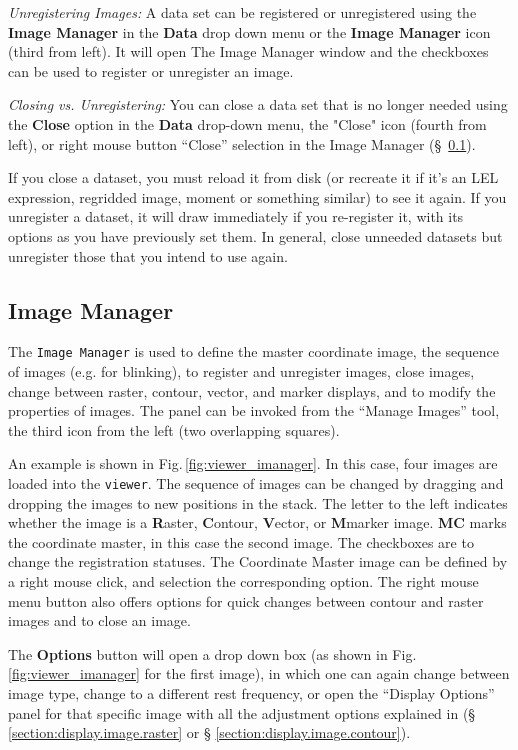 {\em Unregistering Images:} A data set can be registered or
unregistered using the {\bf Image Manager}
in the {\bf  Data} drop down menu or the {\bf Image Manager} icon
(third from left). It will open The Image Manager window and the
checkboxes can be used to register or unregister an image. 

{\em Closing vs. Unregistering:} You can close a data set that is no longer needed using the {\bf Close}
option in the {\bf Data} drop-down menu, the "Close" icon (fourth from
left), or right mouse button ``Close'' selection in the Image Manager (\S~\ref{section:display.viewerGUI.imanager}). 

If you close a dataset, you must reload it from disk (or recreate it if it's an LEL expression, regridded image, 
moment or something similar) to see it again.  If you unregister a dataset, it will draw immediately if you 
re-register it, with its options as you have 
previously set them.  In general, close unneeded datasets but unregister those that you intend to use again.

\subsection{Image Manager}
\label{section:display.viewerGUI.imanager}

The {\tt Image Manager} is used to define the master coordinate image,
the sequence of images (e.g. for blinking), to register and unregister
images, close images, change between raster, contour, vector, and
marker displays, and to modify the properties of images. The panel
can be invoked from the ``Manage Images'' tool, the third icon from
the left (two overlapping squares).

An example is shown in Fig.\,\ref{fig:viewer_imanager}. In this case,
four images are loaded into the {\tt viewer}. The sequence of images
can be changed by dragging and dropping the images to new positions in
the stack. The letter to the left indicates whether the image is a
{\bf R}aster, {\bf C}ontour, {\bf V}ector, or {\bf M}marker
image. {\bf MC} marks the coordinate master, in this case the second
image. The checkboxes are to change the registration statuses. The
Coordinate Master image can be defined by a right mouse click, and
selection the corresponding option. The right mouse menu button also
offers options for quick changes between contour and raster images and
to close an image.

The {\bf Options} button will open a drop down box (as shown in
Fig.\,\ref{fig:viewer_imanager} for the first image), in which one
can again change between image type, change to a different rest
frequency, or open the ``Display Options'' panel for that specific
image with all the adjustment options explained in (\S
\ref{section:display.image.raster} or \S
\ref{section:display.image.contour}).


